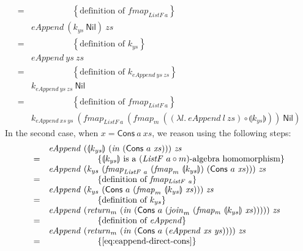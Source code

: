 \documentclass{jfp1}
\newcommand{\fold}[1]{\llparenthesis #1 \rrparenthesis}
\newcommand{\eqAnnotation}[1]{\hspace{2cm}\left\{\textrm{#1}\right\}}
\begin{document}
\begin{proof*}
\begin{displaymath}
\begin{array}{cl}
      =&\eqAnnotation{definition of $\mathit{fmap_{\mathit{ListF}~a}}$} \\
      &\mathit{eAppend}~(k_{ys}~\mathsf{Nil})~\mathit{zs} \\
      =&\eqAnnotation{definition of $k_{ys}$} \\
      &\mathit{eAppend}~\mathit{ys}~\mathit{zs} \\
      =&\eqAnnotation{definition of $k_{\mathit{eAppend}~\mathit{ys}~\mathit{zs}}$} \\
      &k_{\mathit{eAppend}~\mathit{ys}~\mathit{zs}}~\mathsf{Nil} \\
      =&\eqAnnotation{definition of $\mathit{fmap}_{\mathit{ListF}~a}$} \\
      &k_{\mathit{eAppend}~\mathit{xs}~\mathit{ys}}~(\mathit{fmap}_{\mathit{ListF}~a}~(\mathit{fmap}_m~((\lambda l.~\mathit{eAppend}~l~\mathit{zs}) \circ \fold{k_{ys}}))~\mathsf{Nil})
    \end{array}
  \end{displaymath}
  In the second case, when $x = \mathsf{Cons}~a~\mathit{xs}$, we
  reason using the following steps:
  \begin{displaymath}
    \begin{array}{cl}
      &\mathit{eAppend}~(\fold{k_{ys}}~(\mathit{in}~(\mathsf{Cons}~a~\mathit{xs})))~\mathit{zs} \\
      =&\eqAnnotation{$\fold{k_{ys}}$ is a $(\mathit{ListF}~a \circ m)$-algebra homomorphism} \\
      &\mathit{eAppend}~(k_{ys}~(\mathit{fmap}_{\mathit{ListF}~a}~(\mathit{fmap}_m~\fold{k_{ys}})~(\mathsf{Cons}~a~\mathit{xs})))~\mathit{zs} \\
      =&\eqAnnotation{definition of $\mathit{fmap_{\mathit{ListF}~a}}$} \\
      &\mathit{eAppend}~(k_{ys}~(\mathsf{Cons}~a~(\mathit{fmap}_m~\fold{k_{ys}}~\mathit{xs})))~\mathit{zs} \\
      =&\eqAnnotation{definition of $k_{ys}$} \\
      & \mathit{eAppend}~(\mathit{return}_m~(\mathit{in}~(\mathsf{Cons}~a~(\mathit{join}_m~(\mathit{fmap_m}~\fold{k_{ys}}~\mathit{xs})))))~\mathit{zs} \\
      =&\eqAnnotation{definition of $\mathit{eAppend}$} \\
      & \mathit{eAppend}~(\mathit{return}_m~(\mathit{in}~(\mathsf{Cons}~a~(\mathit{eAppend}~\mathit{xs}~\mathit{ys}))))~\mathit{zs} \\
      =&\eqAnnotation{\autoref{eq:eappend-direct-cons}} \\

\end{array}
\end{displaymath}
\end{proof*}
\end{document}
